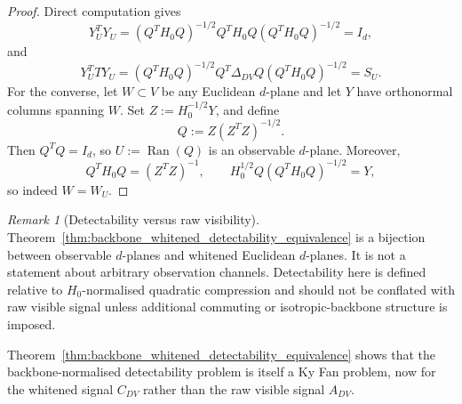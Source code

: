 \documentclass[11pt,a4paper]{article}
\numberwithin{equation}{section}
\theoremstyle{thmcompact}
\theoremstyle{remark}
\newtheorem*{remarkplain}{Remark}
\newenvironment{remark}[1][]%
{\begin{remarkbox}\begin{remarkplain}[#1]\normalfont}
		{\end{remarkplain}\end{remarkbox}}
\begin{document}
\begin{proof}
Direct computation gives
\begin{equation}
Y_U^T Y_U
=
(Q^T H_0 Q)^{-1/2}Q^T H_0 Q (Q^T H_0 Q)^{-1/2}
=I_d,
\end{equation}
and
\begin{equation}
Y_U^T T Y_U
=
(Q^T H_0 Q)^{-1/2}Q^T \Delta_{DV} Q (Q^T H_0 Q)^{-1/2}
=
S_U.
\end{equation}
For the converse, let \(W\subset V\) be any Euclidean \(d\)-plane and let \(Y\) have orthonormal columns spanning \(W\). Set \(Z:=H_0^{-1/2}Y\), and define
\begin{equation}
Q:=Z(Z^TZ)^{-1/2}.
\end{equation}
Then \(Q^TQ=I_d\), so \(U:=\operatorname{Ran}(Q)\) is an observable \(d\)-plane. Moreover,
\begin{equation}
Q^T H_0 Q=(Z^TZ)^{-1},
\qquad
H_0^{1/2}Q(Q^T H_0 Q)^{-1/2}=Y,
\end{equation}
so indeed \(W=W_U\).
\end{proof}

\begin{remark}[Detectability versus raw visibility]
Theorem~\ref{thm:backbone_whitened_detectability_equivalence} is a bijection between observable \(d\)-planes and whitened Euclidean \(d\)-planes. It is not a statement about arbitrary observation channels. Detectability here is defined relative to \(H_0\)-normalised quadratic compression and should not be conflated with raw visible signal unless additional commuting or isotropic-backbone structure is imposed.
\end{remark}

Theorem~\ref{thm:backbone_whitened_detectability_equivalence} shows that the backbone-normalised detectability problem is itself a Ky Fan problem, now for the whitened signal \(C_{DV}\) rather than the raw visible signal \(A_{DV}\).
\end{document}
